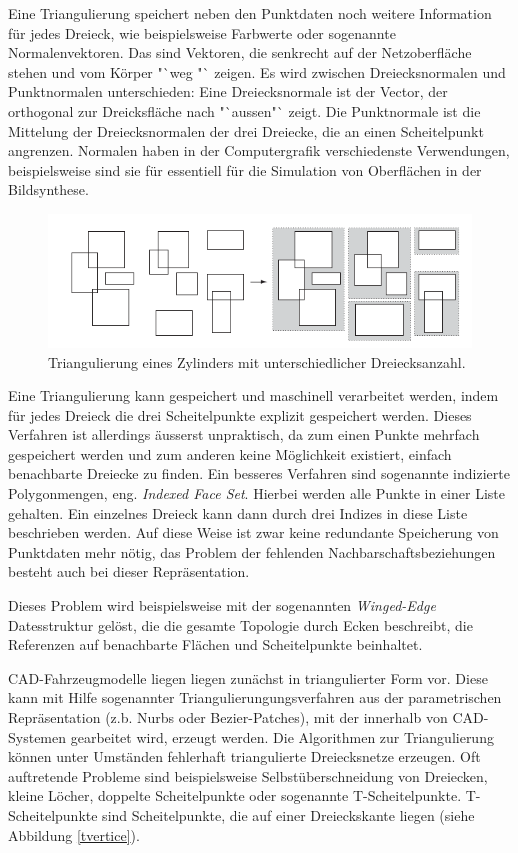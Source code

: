 Eine Triangulierung speichert neben den Punktdaten noch weitere Information f\"ur jedes Dreieck, wie beispielsweise Farbwerte oder sogenannte Normalenvektoren. Das sind Vektoren, die senkrecht auf der Netzoberfläche stehen und vom K\"orper  "`weg "` zeigen. Es wird zwischen Dreiecksnormalen und Punktnormalen unterschieden: Eine Dreiecksnormale ist der Vector, der orthogonal zur Dreicksfläche nach "`aussen"` zeigt. Die Punktnormale ist die Mittelung der  Dreiecksnormalen der drei Dreiecke, die an einen Scheitelpunkt angrenzen. Normalen haben in der Computergrafik verschiedenste Verwendungen, beispielsweise sind sie für essentiell f\"ur die Simulation von Oberfl\"achen in der Bildsynthese.

\begin{figure}[H]
\centerline{
	\includegraphics[width=0.7\columnwidth]{graphics/box.png}
}
\caption{Triangulierung eines Zylinders mit unterschiedlicher Dreiecksanzahl.}
\label{triangulation}
\end{figure}

Eine Triangulierung kann gespeichert und maschinell verarbeitet werden, indem f\"ur jedes Dreieck die drei Scheitelpunkte explizit gespeichert werden. Dieses Verfahren ist allerdings \"ausserst unpraktisch, da zum einen Punkte mehrfach gespeichert werden und zum anderen keine M\"oglichkeit existiert, einfach benachbarte Dreiecke zu finden. Ein besseres Verfahren sind sogenannte indizierte Polygonmengen, eng. \textit{Indexed Face Set}. Hierbei werden alle Punkte in einer Liste gehalten. Ein einzelnes Dreieck kann dann durch drei Indizes in diese Liste beschrieben werden. Auf diese Weise ist zwar keine redundante Speicherung von Punktdaten mehr n\"otig, das Problem der fehlenden Nachbarschaftsbeziehungen besteht auch bei dieser Repr\"asentation. 

Dieses Problem wird beispielsweise mit der sogenannten \textit{Winged-Edge} Datesstruktur gel\"ost, die die gesamte Topologie durch Ecken beschreibt, die Referenzen auf benachbarte Fl\"achen und Scheitelpunkte beinhaltet. 

CAD-Fahrzeugmodelle liegen liegen zunächst in triangulierter Form vor. Diese kann mit Hilfe sogenannter Triangulierungungsverfahren aus der parametrischen Repr\"asentation (z.b. Nurbs oder Bezier-Patches), mit der innerhalb von CAD-Systemen gearbeitet wird, erzeugt werden. Die Algorithmen zur Triangulierung k\"onnen unter Umst\"anden fehlerhaft triangulierte Dreiecksnetze erzeugen. Oft auftretende Probleme sind beispielsweise Selbst\"uberschneidung von Dreiecken, kleine L\"ocher, doppelte Scheitelpunkte oder sogenannte T-Scheitelpunkte. T-Scheitelpunkte sind Scheitelpunkte, die auf einer Dreieckskante liegen (siehe Abbildung \ref{tvertice}). 

